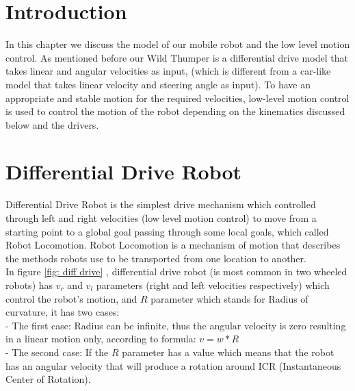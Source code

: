 \newline
\newline
\vspace{3mm}
\hfill

\section{Introduction}
\hspace{2cm}In this chapter we discuss the model of our mobile robot and the low level motion control. As mentioned before our Wild Thumper is a differential drive model that takes linear and angular velocities as input, (which is different from a car-like model that takes  linear velocity and  steering angle as input). To have an appropriate and stable motion for the required velocities, low-level motion control is used to control the motion of the robot depending on the kinematics discussed below and the drivers. \\

\section{Differential Drive Robot}
\hspace{2cm}Differential Drive Robot is the simplest drive mechanism which controlled through left and right velocities (low level motion control) to move from a starting point to a global goal passing through some local goals, which called Robot Locomotion. Robot Locomotion is a mechanism of motion that describes the methods robots use to be transported from one location to another. \\
In figure \ref{fig: diff drive} , differential drive robot (is most common in two wheeled robots) has $v_r$ and $v_l$ parameters (right and left velocities respectively) which control the robot’s motion, and $R$ parameter which stands for Radius of curvature, it has two cases: \\
- The first case: Radius can be infinite, thus the angular velocity is zero resulting in a linear motion only, according to formula: $v = w * R$ \\
- The second case: If the $R$ parameter has a value which means that the robot has an angular velocity that will produce a rotation around ICR (Instantaneous Center of Rotation).\\

